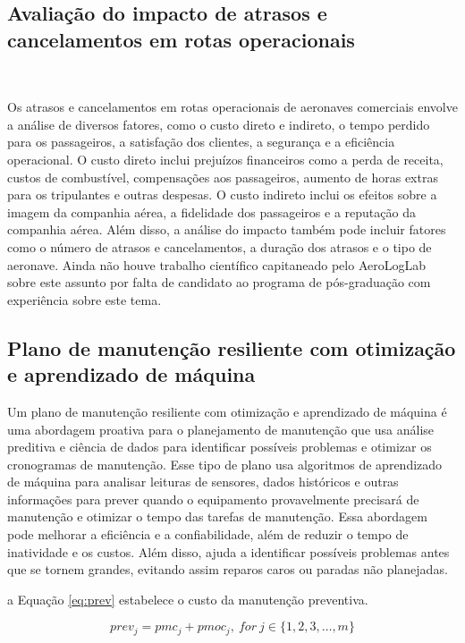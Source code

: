 \documentclass{article}
\begin{document}
\subsection{Avaliação do impacto de atrasos e cancelamentos em rotas operacionais}\

Os atrasos e cancelamentos em rotas operacionais de aeronaves comerciais envolve a análise de diversos fatores, como o custo direto e indireto, o tempo perdido para os passageiros, a satisfação dos clientes, a segurança e a eficiência operacional.
O custo direto inclui prejuízos financeiros como a perda de receita, custos de combustível, compensações aos passageiros, aumento de horas extras para os tripulantes e outras despesas. O custo indireto inclui os efeitos sobre a imagem da companhia aérea, a fidelidade dos passageiros e a reputação da companhia aérea. Além disso, a análise do impacto também pode incluir fatores como o número de atrasos e cancelamentos, a duração dos atrasos e o tipo de aeronave.
Ainda não houve trabalho científico capitaneado pelo AeroLogLab sobre este assunto por falta de candidato ao programa de pós-graduação com experiência sobre este tema.


\subsection{Plano de manutenção resiliente com otimização e aprendizado de máquina}

Um plano de manutenção resiliente com otimização e aprendizado de máquina é uma abordagem proativa para o planejamento de manutenção que usa análise preditiva e ciência de dados para identificar possíveis problemas e otimizar os cronogramas de manutenção.
Esse tipo de plano usa algoritmos de aprendizado de máquina para analisar leituras de sensores, dados históricos e outras informações para prever quando o equipamento provavelmente precisará de manutenção e otimizar o tempo das tarefas de manutenção.
Essa abordagem pode melhorar a eficiência e a confiabilidade, além de reduzir o tempo de inatividade e os custos. Além disso, ajuda a identificar possíveis problemas antes que se tornem grandes, evitando assim reparos caros ou paradas não planejadas.

a Equação \ref{eq:prev} estabelece o custo da manutenção preventiva.


\begin{equation}\label{eq:prev}
prev_j =  pmc_j + pmoc_j,\ for\ j \in \{1, 2, 3, \ldots, m\}
\end{equation}
\end{document}
